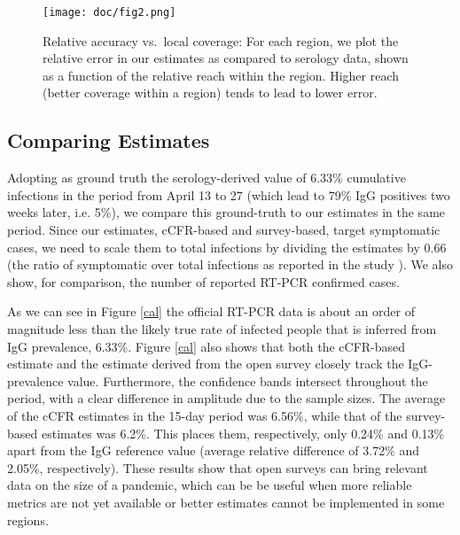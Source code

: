 \documentclass[sigconf]{acmart}
\newcommand{\hh}[1]{{#1}}
\begin{document}
\begin{figure}[htb]
\begin{center}
\texttt{[image: doc/fig2.png]}
\end{center}
\caption{Relative accuracy vs.~local coverage: For each region, we plot the relative error in our estimates as compared to serology data, shown as a function of the relative reach within the region. Higher reach (better coverage within a region) tends to lead to lower error. }
\label{fig:coverage-vs-accuracy}
\end{figure}

\subsection{Comparing Estimates}
\label{s-comparison}

Adopting as ground truth the serology-derived value of 6.33\% cumulative infections in the period from April 13 to 27 (which lead to 79\% IgG positives two weeks later, i.e. 5\%), we compare this ground-truth to our estimates in the same period. Since our estimates, cCFR-based and survey-based, target symptomatic cases, we need to scale them to total infections by dividing the estimates by 0.66 (the ratio of symptomatic over total infections as reported in the study \cite{ENEcovid19}). We also show, for comparison, the number of reported RT-PCR confirmed cases.

As we can see in Figure \ref{cal} the official RT-PCR data is about an order of magnitude less than the likely true rate of infected people that is inferred from IgG prevalence, 6.33\%. Figure \ref{cal} also shows that both the cCFR-based estimate and the estimate derived from the open survey closely track the IgG-prevalence value. \hh{Furthermore, the confidence bands intersect throughout the period, with a clear difference in amplitude due to the sample sizes}.  
% 
The average of the cCFR estimates in the 15-day period was 6.56\%, while that of the survey-based estimates was 6.2\%. This places them, respectively, only 0.24\% and 0.13\% apart from the IgG reference value (average relative difference of 3.72\% and 2.05\%, respectively). These results show that open surveys can bring relevant data on the size of a pandemic, which can be be useful when more reliable metrics are not yet available or better estimates cannot be implemented in some regions. 
\end{document}
